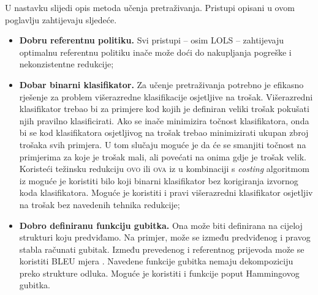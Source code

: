 U nastavku slijedi opis metoda učenja pretraživanja. Pristupi opisani u ovom
poglavlju zahtijevaju sljedeće.

\begin{itemize}

  \item \textbf{Dobru referentnu politiku.} Svi pristupi -- osim \textsc{LOLS} --
  zahtijevaju optimalnu referentnu politiku inače može doći do nakupljanja
  pogreške  i nekonzistentne redukcije;

  \item \textbf{Dobar binarni klasifikator.} Za učenje pretraživanja potrebno je
  efikasno rješenje za problem višerazredne klasifikacije osjetljive na trošak.
  Višerazredni klasifikator trebao bi za primjere kod kojih je definiran veliki
  trošak pokušati njih pravilno klasificirati. Ako se inače minimizira točnost
  klasifikatora, onda bi se kod klasifikatora osjetljivog na trošak trebao
  minimizirati ukupan zbroj trošaka svih primjera. U tom slučaju moguće je da će
  se smanjiti točnost na primjerima za koje je trošak mali, ali povećati na
  onima gdje je trošak velik. Koristeći težinsku redukciju \textsc{ovo} ili
  \textsc{ova}  iz
  \citep{beygelzimer2005error, beygelzimer2005weighted} u kombinaciji s
  \textit{costing} algoritmom iz \citep{zadrozny2003cost} moguće je koristiti
  bilo koji binarni klasifikator bez korigiranja izvornog koda klasifikatora.
  Moguće je koristiti i pravi višerazredni klasifikator osjetljiv na trošak bez
  navedenih tehnika redukcije;

  \item \textbf{Dobro definiranu funkciju gubitka.} Ona može biti definirana na
  cijeloj strukturi koju predviđamo. Na primjer, može se između predviđenog i
  pravog stabla računati  gubitak. Između prevedenog i
  referentnog prijevoda može se koristiti BLEU mjera . Navedene funkcije gubitka nemaju dekompoziciju preko
  strukture odluka. Moguće je koristiti i funkcije poput Hammingovog gubitka.

\end{itemize}
